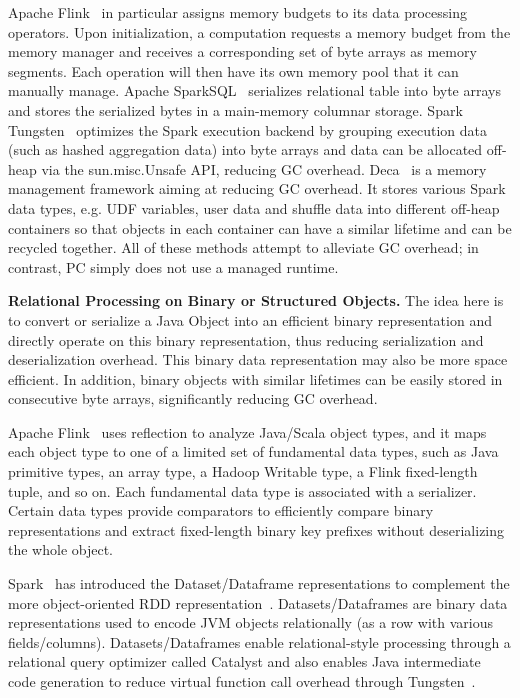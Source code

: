 Apache Flink~\cite{alexandrov2014stratosphere} in particular
assigns memory budgets to its data processing operators. Upon
initialization, a computation requests a memory budget from the
memory manager and receives a corresponding set of byte arrays as memory segments. 
Each operation will then have its own memory pool that it can manually
manage. 
Apache SparkSQL~\cite{armbrust2015spark} serializes 
relational table into byte arrays and stores the serialized bytes
in a main-memory columnar storage. Spark Tungsten~\cite{tungsten}
optimizes the Spark execution backend by grouping execution
data (such as hashed aggregation data) 
into byte arrays and data can be allocated off-heap via
the sun.misc.Unsafe API, reducing
GC overhead. Deca~\cite{lu2016lifetime} is a memory management framework aiming at
reducing GC overhead. It stores
various Spark data types, e.g. UDF variables, user data and
shuffle data into different
off-heap containers so that objects in each container can have a similar
lifetime and can be recycled together.
All of these methods attempt to alleviate GC overhead; in contrast, PC simply does
not use a managed runtime.

\vspace{5pt}
\noindent
\textbf{Relational Processing on Binary or Structured Objects.} The idea here is to convert or
serialize a Java Object into an efficient binary representation and directly
operate on this binary representation, thus reducing serialization and
deserialization overhead.  This 
binary data representation may also be more space efficient. In addition, binary objects
with similar lifetimes can be easily stored in consecutive byte
arrays, significantly reducing GC overhead.

Apache Flink~\cite{alexandrov2014stratosphere} uses reflection
to analyze Java/Scala object types, and it
maps each object type to one of a limited set of
fundamental data types, such as Java primitive types, an array type,
a Hadoop Writable type, a Flink fixed-length tuple, and so on. Each
fundamental data type is associated with a serializer.  Certain data
types provide comparators to efficiently compare binary
representations and extract fixed-length binary key prefixes without
deserializing the whole object.

Spark~\cite{tungsten} has introduced the Dataset/Dataframe representations
to complement the more object-oriented
RDD representation~\cite{zaharia2012resilient}. Datasets/Dataframes are
binary data representations used to encode JVM objects relationally (as a
row with various fields/columns). 
Datasets/Dataframes enable relational-style processing
through a relational query optimizer called Catalyst and
also enables Java intermediate code generation to reduce virtual
function call overhead through Tungsten~\cite{tungsten}. 

